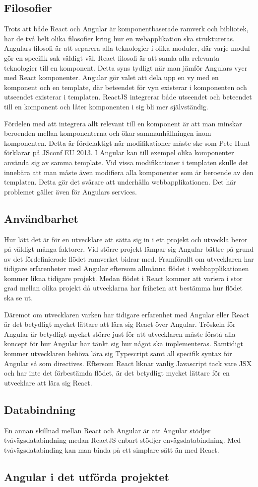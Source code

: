 \subsection{Filosofier}
Trots att både React och Angular är komponentbaserade ramverk och bibliotek, har de två helt olika filosofier kring hur en webapplikation ska struktureras. Angulars filosofi är att separera alla teknologier i olika moduler, där varje modul gör en specifik sak väldigt väl. React filosofi är att samla alla relevanta teknologier till en komponent. Detta syns tydligt när man jämför Angulars vyer med React komponenter. Angular gör valet att dela upp en vy med en komponent och en template, där beteendet för vyn existerar i komponenten och utseendet existerar i templaten. ReactJS integrerar både utseendet och beteendet till en komponent och låter komponenten i sig bli mer självständig. 

Fördelen med att integrera allt relevant till en komponent är att man minskar beroenden mellan komponenterna och ökar sammanhållningen inom komponenten. Detta är fördelaktigt när modifikationer måste ske som Pete Hunt förklarar på JSconf EU 2013.\cite{JSConf} I Angular kan till exempel olika komponenter använda sig av samma template. Vid vissa modifikationer i templaten skulle det innebära att man måste även modifiera alla komponenter som är beroende av den templaten. Detta gör det svårare att underhålla webbapplikationen. Det här problemet gäller även för Angulars services.




\subsection{Användbarhet}
Hur lätt det är för en utvecklare att sätta sig in i ett projekt och utveckla beror på väldigt många faktorer. Vid större projekt lämpar sig Angular bättre på grund av det fördefinierade flödet ramverket bidrar med. Framförallt om utvecklaren har tidigare erfarenheter med Angular eftersom allmänna flödet i webbapplikationen kommer likna tidigare projekt. Medan flödet i React kommer att variera i stor grad mellan olika projekt då utvecklarna har friheten att bestämma hur flödet ska se ut. 

Däremot om utvecklaren varken har tidigare erfarenhet med Angular eller React är det betydligt mycket lättare att lära sig React över Angular. Tröskeln för Angular är betydligt mycket större just för att utvecklaren måste förstå alla koncept för hur Angular har tänkt sig hur något ska implementeras. Samtidigt kommer utvecklaren behöva lära sig Typescript samt all specifik syntax för Angular så som directives. Eftersom React liknar vanlig Javascript tack vare JSX och har inte det förbestämda flödet, är det betydligt mycket lättare för en utvecklare att lära sig React.


\subsection{Databindning}
En annan skillnad mellan React och Angular är att Angular stödjer tvåvägsdatabindning medan ReactJS enbart stödjer envägsdatabindning. Med tvåvägsdatabinding kan man binda på ett simplare sätt än med React.

\subsection{Angular i det utförda projektet}

 
